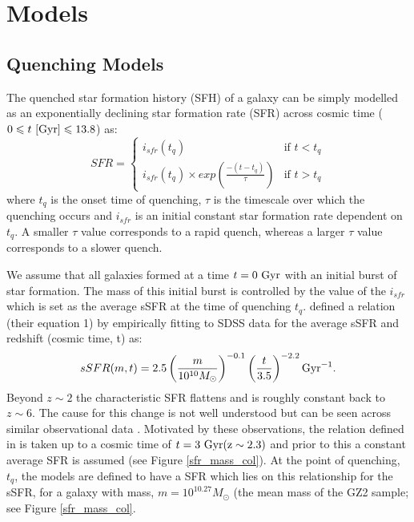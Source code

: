 \documentclass[useAMS,usenatbib]{mn2e}
\def\changed    {\color{titlecol} }
\begin{document}
\section{Models}\label{models}
\subsection{Quenching Models}\label{sfh}

The quenched star formation history (SFH) of a galaxy can be simply modelled as an exponentially declining star formation rate (SFR) across cosmic time ($0 \leq t ~\rm{[Gyr]} \leq 13.8$) as:
\begin{equation}\label{sfh}
SFR =
\begin{cases}
i_{sfr}(t_q) & \text{if } t < t_q \\
i_{sfr}(t_q) \times exp{\left( \frac{-(t-t_{q})}{\tau}\right)} & \text{if } t > t_q 
\end{cases}
\end{equation}
where $t_{q}$ is the onset time of quenching, $\tau$ is the timescale over which the quenching occurs and $i_{sfr}$ is an initial constant star formation rate dependent on $t_q$.  A smaller $\tau$ value corresponds to a rapid quench, whereas a larger $\tau$ value corresponds to a slower quench. 

We assume that all galaxies formed at a time $t=0~\rm{Gyr}$ with an initial burst of star formation. The mass of this initial burst is controlled by the value of the $i_{sfr}$ which is set as the average sSFR at the time of quenching $t_q$. \citet{Peng} defined a relation (their equation 1) by {\changed empirically fitting to SDSS data for the average sSFR and redshift (cosmic time, t)} as:
\begin{equation}
sSFR(m,t) = 2.5 \left( \frac{m}{10^{10} M_{\odot}} \right)^{-0.1} \left(\frac{t}{3.5}\right)^{-2.2} \rm{Gyr}^{-1}.
\end{equation}
Beyond $z \sim 2$ the characteristic SFR flattens and is roughly constant back to $z\sim6$. The cause for this change is not well understood but can be seen across similar observational data \citep{Peng, Gonzalez, Beth}. Motivated by these observations, the relation defined in \citet{Peng} is taken up to a cosmic time of $t=3~\rm{Gyr} (z \sim 2.3)$ and prior to this a constant average SFR is assumed (see Figure \ref{sfr_mass_col}). At the point of quenching, $t_{q}$, the models are defined to have a SFR which lies on this relationship for the sSFR, for a galaxy with mass, $m = 10^{10.27} M_{\odot}$ (the mean mass of the GZ2 sample; see Figure \ref{sfr_mass_col}.
 
\end{document}
